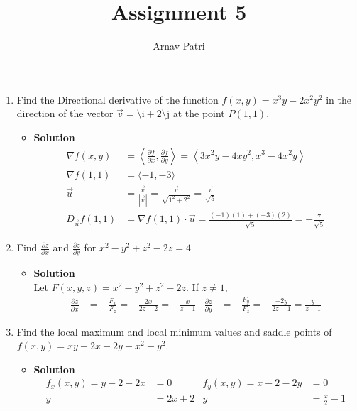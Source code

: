\documentclass[11pt]{article}
\title{Assignment 5}
\author{Arnav Patri}
\newcommand{\pder}[2]{\frac{\partial #1}{\partial #2}}
\newcommand{\vi}{\text{\^\i}}
\newcommand{\vj}{\text{\^\j}}
\begin{document}
	\maketitle
		\thispagestyle{empty}
		\begin{enumerate}
			\item
				Find the Directional derivative of the function $f(x, y) = x^3y - 2x^2y^2$ in the direction of the vector $\vec{v} = \vi + 2\vj$ at the point $P(1, 1)$.
				\begin{itemize}[ ]
					\item \textbf{Solution}
						\begin{align*}
							\nabla f(x, y) &= \left\langle \pder{f}{x}, \pder{f}{y} \right\rangle
									= \left\langle 3x^2y - 4xy^2, x^3 - 4x^2y \right\rangle \\
							\nabla f(1, 1) &= \langle -1, -3 \rangle \\
							\vec{u} &= \frac{\vec{v}}{|\vec{v}|}
									= \frac{\vec{v}}{\sqrt{1^2 + 2^2}} 
									= \frac{\vec{v}}{\sqrt{5}} \\
							D_{\vec{u}}f(1, 1) &= \nabla f(1, 1) \cdot \vec{u}
									= \frac{(-1)(1) + (-3)(2)}{\sqrt{5}}
									= -\frac{7}{\sqrt{5}}
						\end{align*}
				\end{itemize}
			\item
				Find $\pder{z}{x}$ and $\pder{z}{y}$ for $x^2 - y^2 + z^2 - 2z = 4$
				\begin{itemize}[ ]
					\item \textbf{Solution} \\
						Let $F(x, y, z) = x^2 - y^2 + z^2 - 2z$. If $z \ne 1$,
						\begin{align*}
							\pder{z}{x} &= -\frac{F_x}{F_z}
									= -\frac{2x}{2z - 2}
									= -\frac{x}{z - 1} &
							\pder{z}{y} &= -\frac{F_y}{F_z}
									= -\frac{-2y}{2z - 1}
									= \frac{y}{z - 1} 
						\end{align*}
				\end{itemize}
			\item
				Find the local maximum and local minimum values and saddle points of $f(x, y) = xy - 2x - 2y - x^2 - y^2$.
				\begin{itemize}[ ]
					\item \textbf{Solution}
						\begin{align*}
							f_x(x, y) = y - 2 - 2x &= 0 &
									f_y(x, y) = x - 2 - 2y &= 0 \\
								y &= 2x + 2 &
									y &= \frac{x}{2} - 1 \\

\end{align*}
\end{itemize}
\end{enumerate}
\end{document}
